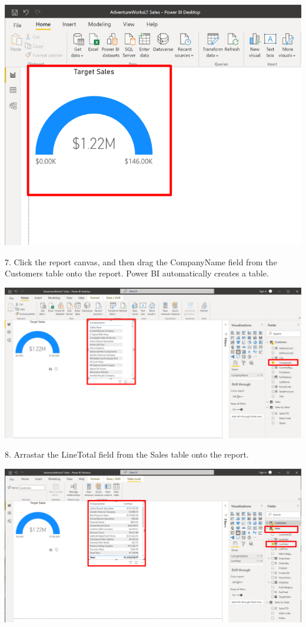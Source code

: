 \documentclass[12pt,letterpaper]{article}
\begin{document}
\begin{center}
    \includegraphics[width=14cm]{img/77.png}
    \vspace{1cm}
\end{center}
7. Click the report canvas, and then drag the CompanyName field from the Customers table onto the report.
Power BI automatically creates a table.
\begin{center}
    \includegraphics[width=18cm]{img/78.png}
    \vspace{1cm}
\end{center}
8. Arrastar the LineTotal field from the Sales table onto the report.
\begin{center}
    \includegraphics[width=18cm]{img/79.png}
    \vspace{2cm}
\end{center}
\end{document}
